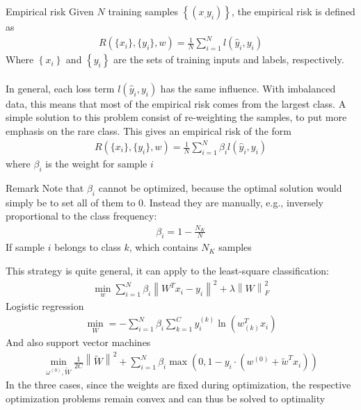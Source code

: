 \begin{parag}{Empirical risk}
    Given $N$ training samples $\left\{\left(x_, y_i\right)\right\}$, the empirical risk is defined as  
	\begin{align*} 
		R\left(\{x_i\}, \{y_i\}, w\right) = \frac{1}{N}\sum_{i= 1}^{N}l\left(\hat{y}_i , y_i\right)
	\end{align*}
	Where $\left\{x_i\right\}$ and $\left\{y_i\right\}$ are the sets of training inputs and labels, respectively.\\
	$ $\\
	In general, each loss term $l\left(\hat{y}_i , y_i\right)$ has the same influence. With imbalanced data, this means that most of the empirical risk comes from the largest class. A simple solution to this problem consist of re-weighting the samples, to put more emphasis on the rare class. This gives an empirical risk of the form 
	\begin{align*} 
		R\left(\{x_i\}, \{y_i\}, w\right) = \frac{1}{N}\sum_{i= 1}^{N}\beta_i l\left(\hat{y}_i , y_i\right)
	\end{align*}
	where $\beta_i$ is the weight for sample $i$
	\begin{subparag}{Remark}
		Note that $\beta_i$ cannot be optimized, because the optimal solution would simply be to set all of them to $0$. Instead they are manually, e.g., inversely proportional to the class frequency:
		\begin{align*} 
			\beta_i = 1 - \frac{N_K}{N}
		\end{align*}
		If sample $i$ belongs to class $k$, which contains $N_K$ samples
	\end{subparag}
	This strategy is quite general, it can apply to the least-square classification:
	\begin{align*} 
		\min_{w} \sum_{i= 1}^{N}\beta_i \left\|W^{T}x_i - y_i\right\|^2 + \lambda \left\|W\right\|_F^2
	\end{align*}
	Logistic regression 
	\begin{align*} 
		\min_W = -\sum_{i= 1}^{N}\beta_i \sum_{k= 1}^{C}y_i^{\left(k\right)}\ln\left(w_{\left(k\right)}^{T}x_i\right)
	\end{align*}
	And also support vector machines 
	\begin{align*} 
		\min_{\omega^{\left(0\right)}, \widetilde{W}}\frac{1}{2C}\left\|\widetilde{W}\right\|^2 + \sum_{i= 1}^{N}\beta_i \max\left(0, 1 - y_i \cdot \left(w^{\left(0\right)} + \widetilde{w}^{T}x_i\right)\right)
	\end{align*}
	In the three cases, since the weights are fixed during optimization, the respective optimization problems remain convex and can thus be solved to optimality
\end{parag}


